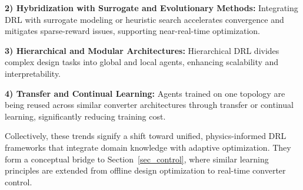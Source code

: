 \textbf{2) Hybridization with Surrogate and Evolutionary Methods:}  
Integrating DRL with surrogate modeling or heuristic search accelerates convergence and mitigates sparse-reward issues, supporting near-real-time optimization.  

\textbf{3) Hierarchical and Modular Architectures:}  
Hierarchical DRL divides complex design tasks into global and local agents, enhancing scalability and interpretability.  

\textbf{4) Transfer and Continual Learning:}  
Agents trained on one topology are being reused across similar converter architectures through transfer or continual learning, significantly reducing training cost.  

Collectively, these trends signify a shift toward unified, physics-informed DRL frameworks that integrate domain knowledge with adaptive optimization.  
They form a conceptual bridge to Section~\ref{sec_control}, where similar learning principles are extended from offline design optimization to real-time converter control.


